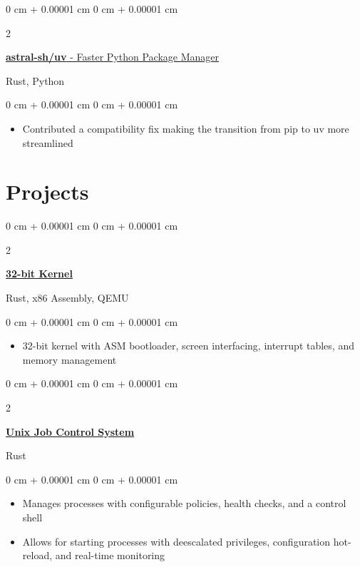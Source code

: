 \documentclass[10pt, letterpaper]{article}
\newenvironment{highlights}{
    \begin{itemize}[
        topsep=0.10 cm,
        parsep=0.10 cm,
        partopsep=0pt,
        itemsep=0pt,
        leftmargin=0 cm + 10pt
    ]
}{
    \end{itemize}
}
\newenvironment{onecolentry}{
    \begin{adjustwidth}{
        0 cm + 0.00001 cm
    }{
        0 cm + 0.00001 cm
    }
}{
    \end{adjustwidth}
}
\newenvironment{twocolentry}[2][]{
    \onecolentry
    \def\secondColumn{#2}
    \setcolumnwidth{\fill, 4.5 cm}
    \begin{paracol}{2}
}{
    \switchcolumn \raggedleft \secondColumn
    \end{paracol}
    \endonecolentry
}
\begin{document}
    \vspace{0.1 cm}

        \begin{twocolentry}
        {Rust, Python}
        \href{https://github.com/astral-sh/uv/}{\textbf{astral-sh/uv} - Faster Python Package Manager}
    \end{twocolentry}

    \vspace{0.05 cm}
    
    \begin{onecolentry}
        \begin{highlights}
            \item Contributed a compatibility fix making the transition from pip to uv more streamlined 
        \end{highlights}
    \end{onecolentry}

    \section{Projects}

    \begin{twocolentry}
        {Rust, x86 Assembly, QEMU}
        \href{https://github.com/kentucky-fried-kernel/kfs}{\textbf{32-bit Kernel}}
    \end{twocolentry}

    \vspace{0.05 cm}
    
    \begin{onecolentry}
        \begin{highlights}
            \item 32-bit kernel with ASM bootloader, screen interfacing, interrupt tables, and memory management 
        \end{highlights}
    \end{onecolentry}

    \vspace{0.2cm}

    \begin{twocolentry}
        {Rust}
        \href{https://github.com/winstonallo/taskmaster}{\textbf{Unix Job Control System}}
    \end{twocolentry}

    \vspace{0.10 cm}
    
    \begin{onecolentry}
        \begin{highlights}
            \item Manages processes with configurable policies, health checks, and a control shell
            \item Allows for starting processes with deescalated privileges, configuration hot-reload, and real-time monitoring 
        \end{highlights}
    \end{onecolentry}
\end{document}
